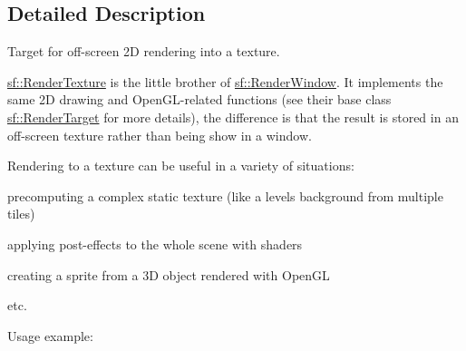 \subsection{Detailed Description}
Target for off-\/screen 2D rendering into a texture. 

\hyperlink{classsf_1_1_render_texture}{sf\+::\+Render\+Texture} is the little brother of \hyperlink{classsf_1_1_render_window}{sf\+::\+Render\+Window}. It implements the same 2D drawing and Open\+G\+L-\/related functions (see their base class \hyperlink{classsf_1_1_render_target}{sf\+::\+Render\+Target} for more details), the difference is that the result is stored in an off-\/screen texture rather than being show in a window.

Rendering to a texture can be useful in a variety of situations\+: \begin{DoxyItemize}
\item precomputing a complex static texture (like a level\textquotesingle{}s background from multiple tiles) \item applying post-\/effects to the whole scene with shaders \item creating a sprite from a 3D object rendered with Open\+GL \item etc.\end{DoxyItemize}
Usage example\+:


